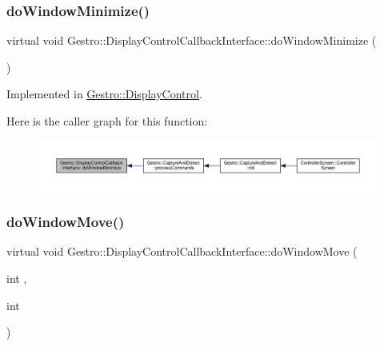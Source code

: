 \subsubsection{\texorpdfstring{do\+Window\+Minimize()}{doWindowMinimize()}}
{\footnotesize\ttfamily virtual void Gestro\+::\+Display\+Control\+Callback\+Interface\+::do\+Window\+Minimize (\begin{DoxyParamCaption}{ }\end{DoxyParamCaption})\hspace{0.3cm}{\ttfamily [pure virtual]}}



Implemented in \hyperlink{class_gestro_1_1_display_control_ad5fa763a77c680ce7b2089c6d79c4eb7}{Gestro\+::\+Display\+Control}.

Here is the caller graph for this function\+:
\nopagebreak
\begin{figure}[H]
\begin{center}
\leavevmode
\includegraphics[width=350pt]{class_gestro_1_1_display_control_callback_interface_a677aa306f08c548396a048c680bf5e10_icgraph}
\end{center}
\end{figure}
\mbox{\label{class_gestro_1_1_display_control_callback_interface_a5232eef7102a1db6d227189132c92ebd}} 
\subsubsection{\texorpdfstring{do\+Window\+Move()}{doWindowMove()}}
{\footnotesize\ttfamily virtual void Gestro\+::\+Display\+Control\+Callback\+Interface\+::do\+Window\+Move (\begin{DoxyParamCaption}\item[{int}]{,  }\item[{int}]{ }\end{DoxyParamCaption})\hspace{0.3cm}{\ttfamily [pure virtual]}}




